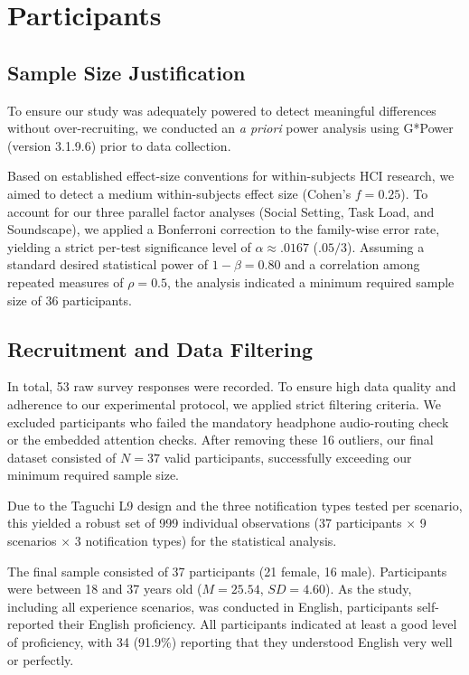 \section{Participants}
\label{sec:participants}

\subsection{Sample Size Justification}
To ensure our study was adequately powered to detect meaningful differences without over-recruiting, we conducted an \textit{a priori} power analysis using G*Power (version 3.1.9.6) prior to data collection. 

Based on established effect-size conventions for within-subjects HCI research, we aimed to detect a medium within-subjects effect size (Cohen's $f = 0.25$). To account for our three parallel factor analyses (Social Setting, Task Load, and Soundscape), we applied a Bonferroni correction to the family-wise error rate, yielding a strict per-test significance level of $\alpha \approx .0167$ ($.05 / 3$). Assuming a standard desired statistical power of $1 - \beta = 0.80$ and a correlation among repeated measures of $\rho = 0.5$, the analysis indicated a minimum required sample size of 36 participants. 

\subsection{Recruitment and Data Filtering}
In total, 53 raw survey responses were recorded. To ensure high data quality and adherence to our experimental protocol, we applied strict filtering criteria. We excluded participants who failed the mandatory headphone audio-routing check or the embedded attention checks. After removing these 16 outliers, our final dataset consisted of $N = 37$ valid participants, successfully exceeding our minimum required sample size. 

Due to the Taguchi L9 design and the three notification types tested per scenario, this yielded a robust set of 999 individual observations (37 participants $\times$ 9 scenarios $\times$ 3 notification types) for the statistical analysis.

The final sample consisted of 37 participants (21 female, 16 male). Participants were between 18 and 37 years old ($M = 25.54$, $SD = 4.60$). As the study, including all experience scenarios, was conducted in English, participants self-reported their English proficiency. All participants indicated at least a good level of proficiency, with 34 (91.9\%) reporting that they understood English very well or perfectly.

